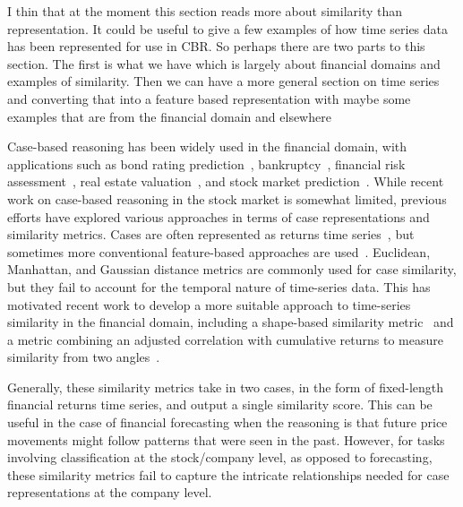 
I thin that at the moment this section reads more about similarity than representation. It could be useful to give a few examples of how time series data has been represented for use in CBR. So perhaps there are two parts to this section. The first is what we have which is largely about financial domains and examples of similarity. Then we can have a more general section on time series and converting that into a feature based representation with maybe some examples that are from the financial domain and elsewhere


Case-based reasoning has been widely used in the financial domain, with applications such as bond rating prediction~\cite{shin1999bond1}, bankruptcy~\cite{jo1997bankruptcy1}, financial risk assessment~\cite{kapdan2019risk}, real estate valuation~\cite{yeh2018realestate}, and stock market prediction~\cite{dolphin2021measuring}. While recent work on case-based reasoning in the stock market is somewhat limited, previous efforts have explored various approaches in terms of case representations and similarity metrics. Cases are often represented as returns time series~\cite{chun2004mining}, but sometimes more conventional feature-based approaches are used~\cite{Ince2014}. Euclidean, Manhattan, and Gaussian distance metrics are commonly used for case similarity, but they fail to account for the temporal nature of time-series data. This has motivated recent work to develop a more suitable approach to time-series similarity in the financial domain, including a shape-based similarity metric~\cite{chun2020geometric} and a metric combining an adjusted correlation with cumulative returns to measure similarity from two angles~\cite{dolphin2021measuring}.

Generally, these similarity metrics take in two cases, in the form of fixed-length financial returns time series, and output a single similarity score.
This can be useful in the case of financial forecasting when the reasoning is that future price movements might follow patterns that were seen in the past. 
However, for tasks involving classification at the stock/company level, as opposed to forecasting, these similarity metrics fail to capture the intricate relationships needed for case representations at the company level.

